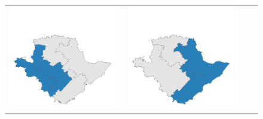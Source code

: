 \begin{figure}[p]
\begin{tabularx}{1\textwidth}{XXXX}
\includegraphics[width=1\linewidth]{images/ch6/mergeoverall/21}&
\includegraphics[width=1\linewidth]{images/ch6/mergeoverall/22}&

\end{tabularx}
\end{figure}
